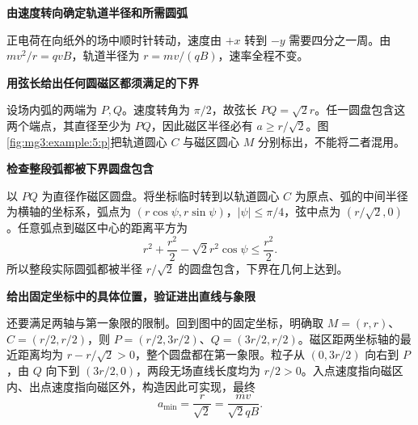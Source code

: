 \begin{solution}\textbf{由速度转向确定轨道半径和所需圆弧}\par\nobreak
正电荷在向纸外的场中顺时针转动，速度由 $+x$ 转到 $-y$ 需要四分之一周。由 $mv^2/r=qvB$，轨道半径为 $r=mv/(qB)$，速率全程不变。



\par\medskip{}\noindent\textbf{用弦长给出任何圆磁区都须满足的下界}\par\nobreak
设场内弧的两端为 $P,Q$。速度转角为 $\pi/2$，故弦长 $PQ=\sqrt2r$。任一圆盘包含这两个端点，其直径至少为 $PQ$，因此磁区半径必有 $a\ge r/\sqrt2$。图\ref{fig:mg3:example:5:p}把轨道圆心 $C$ 与磁区圆心 $M$ 分别标出，不能将二者混用。



\par\medskip{}\noindent\textbf{检查整段弧都被下界圆盘包含}\par\nobreak
以 $PQ$ 为直径作磁区圆盘。将坐标临时转到以轨道圆心 $C$ 为原点、弧的中间半径为横轴的坐标系，弧点为 $(r\cos\psi,r\sin\psi)$，$|\psi|\le\pi/4$，弦中点为 $(r/\sqrt2,0)$。任意弧点到磁区中心的距离平方为
\[
 r^2+\frac{r^2}{2}-\sqrt2r^2\cos\psi\le\frac{r^2}{2}.
\]
所以整段实际圆弧都被半径 $r/\sqrt2$ 的圆盘包含，下界在几何上达到。



\par\medskip{}\noindent\textbf{给出固定坐标中的具体位置，验证进出直线与象限}\par\nobreak
还要满足两轴与第一象限的限制。回到图中的固定坐标，明确取 $M=(r,r)$、$C=(r/2,r/2)$，则 $P=(r/2,3r/2)$、$Q=(3r/2,r/2)$。磁区距两坐标轴的最近距离均为 $r-r/\sqrt2>0$，整个圆盘都在第一象限。粒子从 $(0,3r/2)$ 向右到 $P$，由 $Q$ 向下到 $(3r/2,0)$，两段无场直线长度均为 $r/2>0$。入点速度指向磁区内、出点速度指向磁区外，构造因此可实现，最终
\[\boxed{a_{\min}=\frac{r}{\sqrt2}=\frac{mv}{\sqrt2qB}}.\]
\end{solution}
